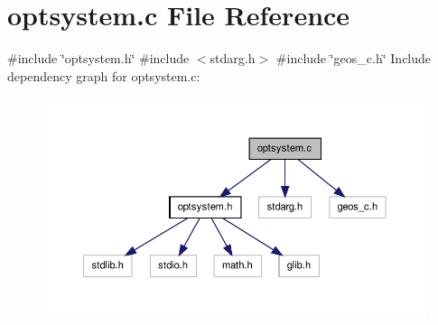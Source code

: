 \hypertarget{a00017}{\section{optsystem.\-c \-File \-Reference}
\label{d4/d51/a00017}
}
{\ttfamily \#include \char`\"{}optsystem.\-h\char`\"{}}\*
{\ttfamily \#include $<$stdarg.\-h$>$}\*
{\ttfamily \#include \char`\"{}geos\-\_\-c.\-h\char`\"{}}\*
\-Include dependency graph for optsystem.\-c\-:
\nopagebreak
\begin{figure}[H]
\begin{center}
\leavevmode
\includegraphics[width=350pt]{dc/d3c/a00028}
\end{center}
\end{figure}
